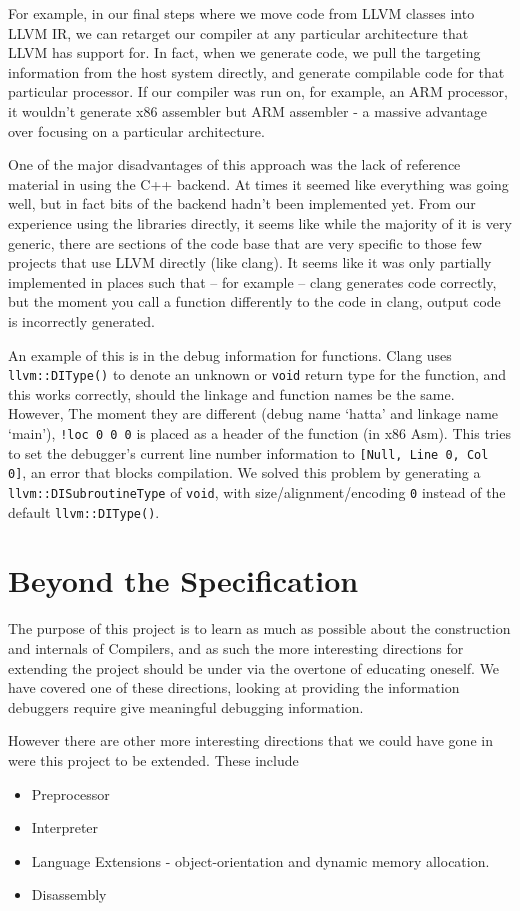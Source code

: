 \documentclass[a4wide, 11pt]{article}
\begin{document}
For example, in our final steps where we move code from LLVM classes into LLVM IR, we can retarget our compiler at any particular architecture that LLVM has support for. In fact, when we generate code, we pull the targeting information from the host system directly, and generate compilable code for that particular processor. If our compiler was run on, for example, an ARM processor, it wouldn't generate x86 assembler but ARM assembler - a massive advantage over focusing on a particular architecture.

One of the major disadvantages of this approach was the lack of reference material in using the C++ backend. At times it seemed like everything was going well, but in fact bits of the backend hadn't been implemented yet. From our experience using the libraries directly, it seems like while the majority of it is very generic, there are sections of the code base that are very specific to those few projects that use LLVM directly (like clang). It seems like it was only partially implemented in places such that -- for example -- clang generates code correctly, but the moment you call a function differently to the code in clang, output code is incorrectly generated.

An example of this is in the debug information for functions. Clang uses \texttt{llvm::DIType()} to denote an unknown or \texttt{void} return type for the function, and this works correctly, should the linkage and function names be the same. However, The moment they are different (debug name `hatta' and linkage name `main'), \texttt{!loc 0 0 0} is placed as a header of the function (in x86 Asm). This tries to set the debugger's current line number information to \texttt{[Null, Line 0, Col 0]}, an error that blocks compilation. We solved this problem by generating a \texttt{llvm::DISubroutineType} of \texttt{void}, with size/alignment/encoding \texttt{0} instead of the default \texttt{llvm::DIType()}. 

\section{Beyond the Specification}

The purpose of this project is to learn as much as possible about the construction and internals of Compilers, and as such the more interesting directions for extending the project should be under via the overtone of educating oneself. We have covered one of these directions, looking at providing the information debuggers require give meaningful debugging information. 

However there are other more interesting directions that we could have gone in were this project to be extended. These include
\begin{itemize}
\item Preprocessor
\item Interpreter
\item Language Extensions - object-orientation and dynamic memory allocation.
\item Disassembly
\end{itemize}
\end{document}
